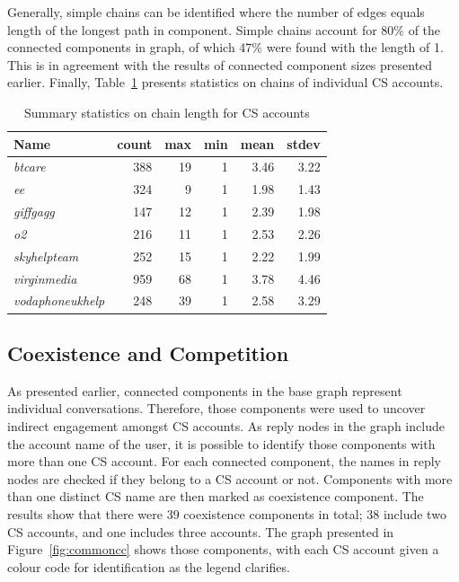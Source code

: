\documentclass[sigconf]{acmart}
\begin{document}
{Generally, simple chains can be identified where the number of edges
equals length of the longest path in component. Simple chains account
for 80\% of the connected components in graph, of which 47\% were
found with the length of 1. This is in agreement with the results of
connected component sizes presented earlier. Finally,
Table~\ref{tbl:delaystatscl} presents statistics on chains of
individual CS accounts.


\begin{table}[!h]
\centering
\begin{tabularx}{\columnwidth}{lrrrrr}
\toprule
\textbf{Name} & \textbf{count} & \textbf{max} & \textbf{min} & \textbf{mean} & \textbf{stdev}\\ 
\midrule
{\emph{btcare}} & 388 & 19 & 1 & 3.46 & 3.22\\
{\emph{ee}} & 324 & 9 & 1 & 1.98 & 1.43\\
{\emph{giffgagg}} & 147 & 12 & 1 & 2.39 & 1.98\\ 
{\emph{o2}} & 216 & 11 & 1 & 2.53 & 2.26\\
{\emph{skyhelpteam}} & 252 & 15 & 1 & 2.22 & 1.99\\
{\emph{virginmedia}} & 959 & 68 & 1 & 3.78 & 4.46\\
{\emph{vodaphoneukhelp}} & 248 & 39 & 1 & 2.58 & 3.29\\
\bottomrule
\end{tabularx}
\caption{Summary statistics on chain length for CS accounts}
\label{tbl:delaystatscl}
\end{table}

\subsection{Coexistence and Competition}

As presented earlier, connected components in the base graph represent
individual conversations. Therefore, those components were used to
uncover indirect engagement amongst CS accounts. As reply nodes in the
graph include the account name of the user, it is possible to identify
those components with more than one CS account. For each connected
component, the names in reply nodes are checked if they belong to a CS
account or not. Components with more than one distinct CS name are
then marked as coexistence component. The results show that there were
39 coexistence components in total; 38 include two CS accounts, and
one includes three accounts. The graph presented in
Figure~\ref{fig:commoncc} shows those components, with each CS account
given a colour code for identification as the legend clarifies.

}
\end{document}
